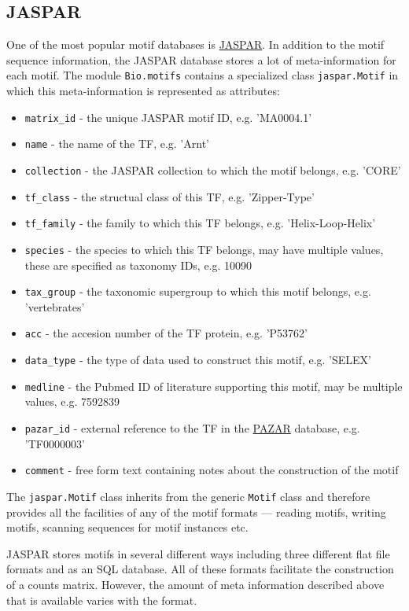\documentclass{report}
\begin{document}
\subsection{JASPAR}
One of the most popular motif databases is \href{http://jaspar.genereg.net}{JASPAR}. In addition to the motif sequence information, the JASPAR database stores a lot of meta-information for each motif. The module \verb+Bio.motifs+ contains a specialized class \verb+jaspar.Motif+ in which this meta-information is represented as attributes:
\begin{itemize}
    \item \verb+matrix_id+ - the unique JASPAR motif ID, e.g. 'MA0004.1'
    \item \verb+name+ - the name of the TF, e.g. 'Arnt'
    \item \verb+collection+ - the JASPAR collection to which the motif belongs, e.g. 'CORE'
    \item \verb+tf_class+ - the structual class of this TF, e.g. 'Zipper-Type'
    \item \verb+tf_family+ - the family to which this TF belongs, e.g. 'Helix-Loop-Helix'
    \item \verb+species+ - the species to which this TF belongs, may have multiple values, these are specified as taxonomy IDs, e.g. 10090
    \item \verb+tax_group+ - the taxonomic supergroup to which this motif belongs, e.g. 'vertebrates'
    \item \verb+acc+ - the accesion number of the TF protein, e.g. 'P53762'
    \item \verb+data_type+ - the type of data used to construct this motif, e.g. 'SELEX'
    \item \verb+medline+ - the Pubmed ID of literature supporting this motif, may be multiple values, e.g. 7592839 
    \item \verb+pazar_id+ - external reference to the TF in the \href{http://pazar.info}{PAZAR} database, e.g. 'TF0000003'
    \item \verb+comment+ - free form text containing notes about the construction of the motif
\end{itemize}

The \verb+jaspar.Motif+ class inherits from the generic \verb+Motif+ class and therefore provides all the facilities of any of the motif formats --- reading motifs, writing motifs, scanning sequences for motif instances etc.

JASPAR stores motifs in several different ways including three different flat file formats and as an SQL database. All of these formats facilitate the construction of a counts matrix. However, the amount of meta information described above that is available varies with the format.
\end{document}

